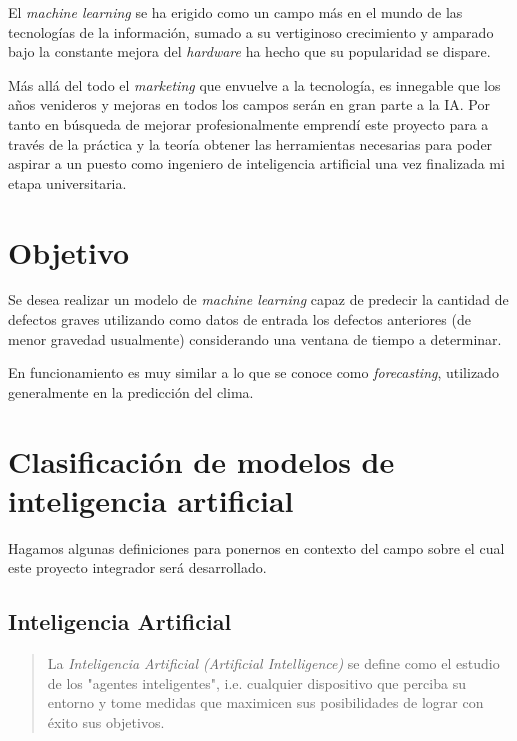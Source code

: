 \documentclass[a4paper,12pt]{article}
\begin{document}
El \textit{machine learning} se ha erigido como un campo más en el mundo de las tecnologías de la información, sumado a su vertiginoso crecimiento y amparado bajo la constante mejora del \textit{hardware} ha hecho que su popularidad se dispare.

Más allá del todo el \textit{marketing} que envuelve a la tecnología, es innegable que los años venideros y mejoras en todos los campos serán en gran parte a la IA. Por tanto en búsqueda de mejorar profesionalmente emprendí este proyecto para a través de la práctica y la teoría obtener las herramientas necesarias para poder aspirar a un puesto como ingeniero de inteligencia artificial una vez finalizada mi etapa universitaria.

\clearpage

\section{Objetivo}

Se desea realizar un modelo de \textit{machine learning} capaz de predecir la cantidad de defectos graves utilizando como datos de entrada los defectos anteriores (de menor gravedad usualmente) considerando una ventana de tiempo a determinar.

En funcionamiento es muy similar a lo que se conoce como \textit{forecasting}, utilizado generalmente en la predicción del clima.

\clearpage

\section{Clasificación de modelos de inteligencia artificial}

Hagamos algunas definiciones para ponernos en contexto del campo sobre el cual este proyecto integrador será desarrollado.

\subsection{Inteligencia Artificial}

\begin{quote}
  La \textit{Inteligencia Artificial (Artificial Intelligence)} se define como el estudio de los "agentes inteligentes", i.e. cualquier dispositivo que perciba su entorno y tome medidas que maximicen sus posibilidades de lograr con éxito sus objetivos.
  
  \hfill \citet{poole1998}
\end{quote}
\end{document}
